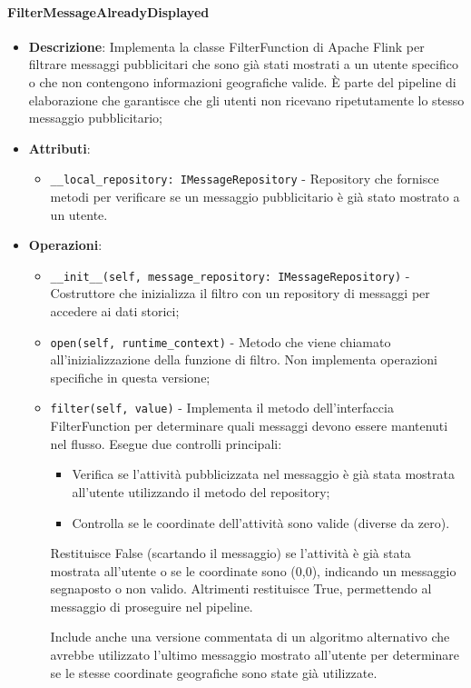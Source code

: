 \documentclass[10pt]{article}
\begin{document}
    \paragraph{FilterMessageAlreadyDisplayed}
    \begin{itemize} 
    \item \textbf{Descrizione}: Implementa la classe FilterFunction di Apache Flink per filtrare messaggi pubblicitari che sono già stati mostrati a un utente specifico o che non contengono informazioni geografiche valide. È parte del pipeline di elaborazione che garantisce che gli utenti non ricevano ripetutamente lo stesso messaggio pubblicitario;
    \item \textbf{Attributi}:
    \begin{itemize}
        \item \texttt{\_\_local\_repository: IMessageRepository} - Repository che fornisce metodi per verificare se un messaggio pubblicitario è già stato mostrato a un utente.
    \end{itemize}
    
    \item \textbf{Operazioni}:
    \begin{itemize}
        \item \texttt{\_\_init\_\_(self, message\_repository: IMessageRepository)} - Costruttore che inizializza il filtro con un repository di messaggi per accedere ai dati storici;
        
        \item \texttt{open(self, runtime\_context)} - Metodo che viene chiamato all'inizializzazione della funzione di filtro. Non implementa operazioni specifiche in questa versione;
        
        \item \texttt{filter(self, value)} - Implementa il metodo dell'interfaccia FilterFunction per determinare quali messaggi devono essere mantenuti nel flusso. Esegue due controlli principali:
        \begin{itemize}
            \item Verifica se l'attività pubblicizzata nel messaggio è già stata mostrata all'utente utilizzando il metodo del repository;
            \item Controlla se le coordinate dell'attività sono valide (diverse da zero).
        \end{itemize}
        Restituisce False (scartando il messaggio) se l'attività è già stata mostrata all'utente o se le coordinate sono (0,0), indicando un messaggio segnaposto o non valido. Altrimenti restituisce True, permettendo al messaggio di proseguire nel pipeline.
        
        Include anche una versione commentata di un algoritmo alternativo che avrebbe utilizzato l'ultimo messaggio mostrato all'utente per determinare se le stesse coordinate geografiche sono state già utilizzate.
    \end{itemize}
    \end{itemize}
\end{document}
